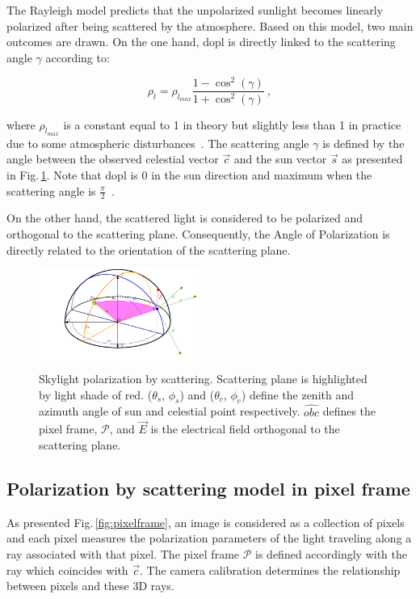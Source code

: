 The Rayleigh model predicts that the unpolarized sunlight becomes linearly
polarized after being scattered by the atmosphere. Based on this model, two
main outcomes are drawn. On the one hand, \gls{dopl} is directly linked to the
scattering angle $\gamma$ according to:

\begin{equation}
  \label{eq:3}
  \rho_{l} = \rho_{l_{max}}\frac{1 - \cos^{2}(\gamma)}{1 + \cos^{
      2}(\gamma)} \ ,
\end{equation}

\noindent where $\rho_{l_{max}}$ is a constant equal to 1 in theory but
slightly less than 1 in practice due to some atmospheric
disturbances~\cite{pomozi2001clearsky}. The scattering angle $\gamma$ is
defined by the angle between the observed celestial vector $\vec{c}$ and the
sun vector $\vec{s}$ as presented in Fig.\,\ref{fig:scattering}. Note that
\gls{dopl} is 0 in the sun direction and maximum when the scattering angle is
$\frac{\pi}{2}$~\cite{smith2007polarization,miyazaki09sunlightpolarization}.

On the other hand, the scattered light is considered to be polarized and
orthogonal to the scattering plane.  Consequently, the Angle of Polarization is
directly related to the orientation of the scattering plane.

\begin{figure}
  \centering
  \includegraphics[width=0.47\textwidth]{./content/intro/figures/polasky-iros.pdf}
  \caption{Skylight polarization by scattering. Scattering plane is highlighted
  by light shade of red. ($\theta_s$, $\phi_s$) and ($\theta_c$, $\phi_c$)
  define the zenith and azimuth angle of sun and celestial point
  respectively. $\widehat{obc}$ defines the pixel frame, $\mathcal{P}$, and
  $\vec{E}$ is the electrical field orthogonal to the scattering plane.}
    \label{fig:scattering}
\end{figure}


\subsection{Polarization by scattering model in pixel frame}
\label{subsec:pscattering}
As presented Fig.\,\ref{fig:pixelframe}, an image is considered as a collection
of pixels and each pixel measures the polarization parameters of the light
traveling along a ray associated with that pixel. The pixel frame
$\mathcal{P}$ is defined accordingly with the ray which coincides with
$\vec{c}$. The camera calibration determines the relationship between pixels
and these 3D rays.

